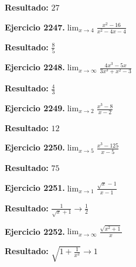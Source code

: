 \documentclass[10pt,a4paper]{article}
\begin{document}
\begin{solbox}
\textbf{Resultado:} \(\displaystyle 27\)
\end{solbox}

\begin{ejbox}
\textbf{Ejercicio 2247.}\quad $\lim_{x\to 4} \frac{x^2-16}{x^2-4x-4}$
\end{ejbox}

\begin{solbox}
\textbf{Resultado:} \(\displaystyle \frac{8}{5}\)
\end{solbox}

\begin{ejbox}
\textbf{Ejercicio 2248.}\quad $\lim_{x\to \infty} \frac{4x^3 - 5x}{3x^3 + x^2 - 3}$
\end{ejbox}

\begin{solbox}
\textbf{Resultado:} \(\displaystyle \frac{4}{3}\)
\end{solbox}

\newpage
\begin{ejbox}
\textbf{Ejercicio 2249.}\quad $\lim_{x\to 2} \frac{x^3-8}{x-2}$
\end{ejbox}

\begin{solbox}
\textbf{Resultado:} \(\displaystyle 12\)
\end{solbox}

\begin{ejbox}
\textbf{Ejercicio 2250.}\quad $\lim_{x\to 5} \frac{x^3-125}{x-5}$
\end{ejbox}

\begin{solbox}
\textbf{Resultado:} \(\displaystyle 75\)
\end{solbox}

\begin{ejbox}
\textbf{Ejercicio 2251.}\quad $\lim_{x\to 1} \frac{\sqrt{x}-1}{x-1}$
\end{ejbox}

\begin{solbox}
\textbf{Resultado:} \(\displaystyle \frac{1}{\sqrt{x}+1} \to \frac{1}{2}\)
\end{solbox}

\newpage
\begin{ejbox}
\textbf{Ejercicio 2252.}\quad $\lim_{x\to \infty} \frac{\sqrt{x^2+1}}{x}$
\end{ejbox}

\begin{solbox}
\textbf{Resultado:} \(\displaystyle \sqrt{1+\frac{1}{x^2}} \to 1\)
\end{solbox}
\end{document}
